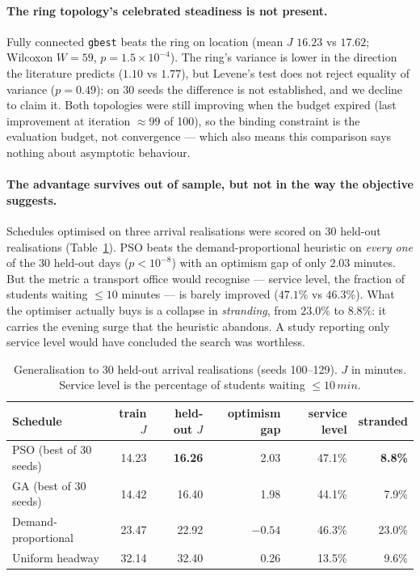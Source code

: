 \documentclass[11pt]{article}
\begin{document}
\paragraph{The ring topology's celebrated steadiness is not present.} Fully connected
\texttt{gbest} beats the ring on location (mean $J$ $16.23$ vs $17.62$; Wilcoxon $W = 59$,
$p = 1.5\times10^{-4}$). The ring's variance is lower in the direction the literature predicts
\citep{kennedy2002population} ($1.10$ vs $1.77$), but Levene's test does not reject equality of
variance ($p = 0.49$): on 30 seeds the difference is not established, and we decline to claim it.
Both topologies were still improving when the budget expired (last improvement at iteration
$\approx 99$ of 100), so the binding constraint is the evaluation budget, not convergence --- which
also means this comparison says nothing about asymptotic behaviour.

\paragraph{The advantage survives out of sample, but not in the way the objective suggests.}
Schedules optimised on three arrival realisations were scored on 30 held-out realisations
(Table~\ref{tab:pso-gen}). PSO beats the demand-proportional heuristic on \emph{every one} of the
30 held-out days ($p < 10^{-8}$) with an optimism gap of only 2.03 minutes. But the metric a
transport office would recognise --- service level, the fraction of students waiting
$\le 10$ minutes --- is barely improved ($47.1\%$ vs $46.3\%$). What the optimiser actually buys is
a collapse in \emph{stranding}, from $23.0\%$ to $8.8\%$: it carries the evening surge that the
heuristic abandons. A study reporting only service level would have concluded the search was
worthless.

\begin{table}[t]
\centering
\small
\caption{Generalisation to 30 held-out arrival realisations (seeds 100--129). $J$ in minutes.
Service level is the percentage of students waiting $\le 10\,min$.}
\label{tab:pso-gen}
\begin{tabular}{@{}lrrrrr@{}}
\toprule
\textbf{Schedule} & \textbf{train $J$} & \textbf{held-out $J$} & \textbf{optimism gap} &
\textbf{service level} & \textbf{stranded} \\
\midrule
PSO (best of 30 seeds)  & 14.23 & \textbf{16.26} & 2.03  & 47.1\% & \textbf{8.8\%} \\
GA (best of 30 seeds)   & 14.42 & 16.40 & 1.98  & 44.1\% & 7.9\% \\
Demand-proportional     & 23.47 & 22.92 & $-0.54$ & 46.3\% & 23.0\% \\
Uniform headway         & 32.14 & 32.40 & 0.26  & 13.5\% & 9.6\% \\
\bottomrule
\end{tabular}
\end{table}
\end{document}
